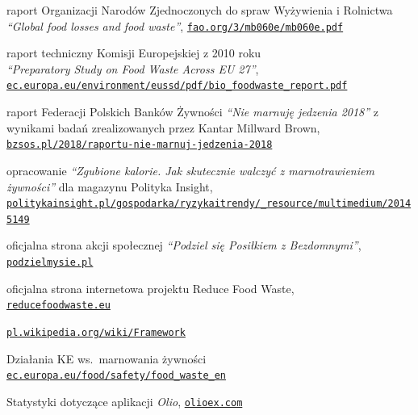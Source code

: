 \documentclass[licencjacka]{pracamgr}
\begin{document}
\begin{thebibliography}{99}

 raport Organizacji Narodów Zjednoczonych do spraw Wyżywienia i Rolnictwa\\\textit{``Global food losses and food waste''}, \href{http://www.fao.org/3/mb060e/mb060e.pdf}{\texttt{fao.org/3/mb060e/mb060e.pdf}}

 raport techniczny Komisji Europejskiej z 2010 roku\\\textit{``Preparatory Study on Food Waste Across EU 27''},\\\href{http://ec.europa.eu/environment/eussd/pdf/bio\_foodwaste\_report.pdf}{\texttt{ec.europa.eu/environment/eussd/pdf/bio\_foodwaste\_report.pdf}}

raport Federacji Polskich Banków Żywności \textit{``Nie marnuję jedzenia 2018''} z wynikami badań zrealizowanych przez Kantar Millward Brown,\\\href{http://bzsos.pl/2018/raportu-nie-marnuj-jedzenia-2018}{\texttt{bzsos.pl/2018/raportu-nie-marnuj-jedzenia-2018}}

opracowanie \textit{``Zgubione kalorie. Jak skutecznie walczyć z marnotrawieniem żywności''} dla magazynu Polityka Insight,\\\href{http://politykainsight.pl/gospodarka/ryzykaitrendy/\_resource/multimedium/20145149}{\texttt{politykainsight.pl/gospodarka/ryzykaitrendy/\_resource/multimedium/20145149}}

 oficjalna strona akcji społecznej \textit{``Podziel się Posiłkiem z Bezdomnymi''}, \href{http://www.podzielmysie.pl}{\texttt{podzielmysie.pl}}

 oficjalna strona internetowa projektu Reduce Food Waste,\\
    \href{http://www.reducefoodwaste.eu}{\texttt{reducefoodwaste.eu}}

 \href{https://pl.wikipedia.org/wiki/Framework}{\texttt{pl.wikipedia.org/wiki/Framework}}

 Działania KE ws.\ marnowania żywności\\ \href{https://ec.europa.eu/food/safety/food_waste_en}{\texttt{ec.europa.eu/food/safety/food\_waste\_en}}

 Statystyki dotyczące aplikacji \textit{Olio}, \href{https://www.olioex.com}{\texttt{olioex.com}}


\end{thebibliography}
\end{document}
